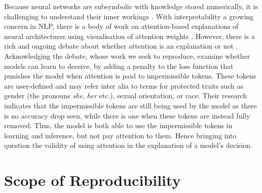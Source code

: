 Because neural networks are subsymbolic with knowledge stored numerically, it is challenging to understand their inner workings \citep{galassi2020attention}. With interpretability a growing concern in NLP, there is a body of work on attention-based explanations of neural architectures using visualisation of attention weights \citep{serrano2019attention}. However, there is a rich and ongoing debate about whether attention is an explanation or not \citep{jain2019attention,wiegreffe2019attention}. Acknowledging the debate, \citet{pruthi-etal-2020-learning} whose work we seek to reproduce, examine whether models can learn to deceive, by adding a penalty to the loss function that punishes the model when attention is paid to impermissible tokens. These tokens are user-defined and may refer inter alia to terms for protected traits such as gender (the pronouns \textit{she}, \textit{her} etc.), sexual orientation, or race. Their research indicates that the impermissible tokens are still being used by the model as there is no accuracy drop seen, while there is one when these tokens are instead fully removed. Thus, the model is both able to use the impermissible tokens in learning and inference, but not pay attention to them. Hence bringing into question the validity of using attention in the explanation of a model's decision.

\section{Scope of Reproducibility}
\label{sec:claims}



